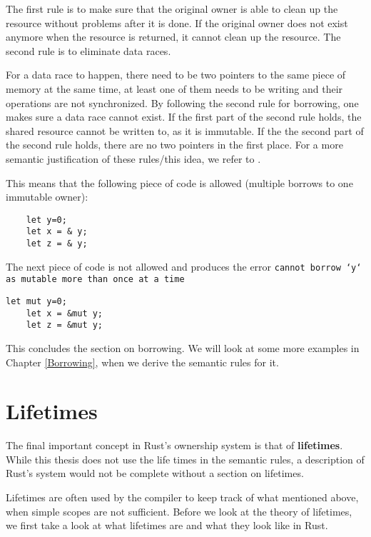 The first rule is to make sure that the original owner is able to clean up the resource without problems after it is done. If the original owner does not exist anymore when the resource is returned, it cannot clean up the resource. The second rule is to eliminate data races. 

For a data race to happen, there need to be two pointers to the same piece of memory at the same time, at least one of them needs to be writing and their operations are not synchronized. By following the second rule for borrowing, one makes sure a data race cannot exist. If the first part of the second rule holds, the shared resource cannot be written to, as it is immutable. If the the second part of the second rule holds, there are no two pointers in the first place. For a more semantic justification of these rules/this idea, we refer to \cite{boyland2003checking}.

This means that the following piece of code is allowed (multiple borrows to one immutable owner):

\begin{verbatim}
	let y=0;
	let x = & y; 
	let z = & y;
\end{verbatim}

The next piece of code is not allowed and produces the error \texttt{cannot borrow `y` as mutable more than once at a time}

\begin{verbatim}
let mut y=0;
	let x = &mut y; 
	let z = &mut y;
\end{verbatim}

This concludes the section on borrowing. We will look at some more examples in Chapter \ref{Borrowing}, when we derive the semantic rules for it. 

\section{Lifetimes}
The final important concept in Rust's ownership system is that of \textbf{lifetimes}. While this thesis does not use the life times in the semantic rules, a description of Rust's system would not be complete without a section on lifetimes. 

Lifetimes are often used by the compiler to keep track of what mentioned above, when simple scopes are not sufficient. Before we look at the theory of lifetimes, we first take a look at what lifetimes are and what they look like in Rust.
 
